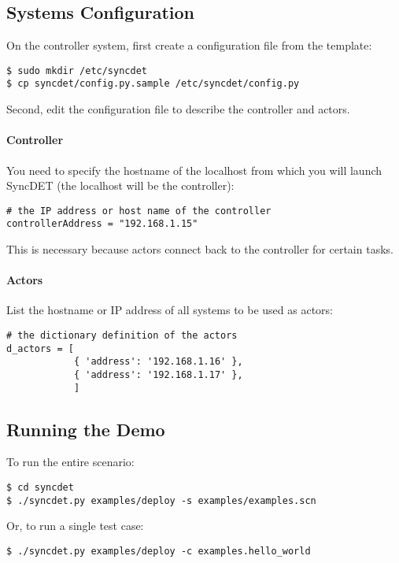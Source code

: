 \subsection{Systems Configuration}
On the controller system, first create a configuration file from the template:
\begin{verbatim}
$ sudo mkdir /etc/syncdet
$ cp syncdet/config.py.sample /etc/syncdet/config.py
\end{verbatim}

Second, edit the configuration file to describe the controller and actors.

\paragraph{Controller}
You need to specify the hostname of the localhost from which you will launch
SyncDET (the localhost will be the controller):
\begin{verbatim}
# the IP address or host name of the controller
controllerAddress = "192.168.1.15"
\end{verbatim}
This is necessary because actors connect back to the controller for certain tasks.

\paragraph{Actors} 
List the hostname or IP address of all systems to be used as actors:
\begin{verbatim}
# the dictionary definition of the actors
d_actors = [
            { 'address': '192.168.1.16' },
            { 'address': '192.168.1.17' },
            ]
\end{verbatim}

\subsection{Running the Demo}

To run the entire scenario:
\begin{verbatim}
$ cd syncdet
$ ./syncdet.py examples/deploy -s examples/examples.scn
\end{verbatim}

Or, to run a single test case:
\begin{verbatim}
$ ./syncdet.py examples/deploy -c examples.hello_world
\end{verbatim}
